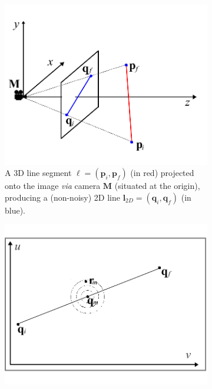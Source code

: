 \documentclass[10pt]{article}
\begin{document}
\begin{figure}
\centering
\begin{subfigure}{.4\textwidth}
  \centering
  \includegraphics[width=1\linewidth]{figures/line-projection-3d}
  \caption{A 3D line segment $\boldsymbol{\ell} = (\mathbf{p}_i, \mathbf{p}_f)$ (in red) projected onto the image {\em via} camera $\mathbf{M}$ (situated at the origin), producing a (non-noisy) 2D line $\mathbf{l}_{2D} = (\mathbf{q}_i, \mathbf{q}_f)$ (in blue).}
  \label{fig:3d}
\end{subfigure}%
\hspace{1cm}
\begin{subfigure}{.4\textwidth}
  \centering
  \includegraphics[width=1\linewidth]{figures/line-projection-2d}

\end{subfigure}
\end{figure}
\end{document}
